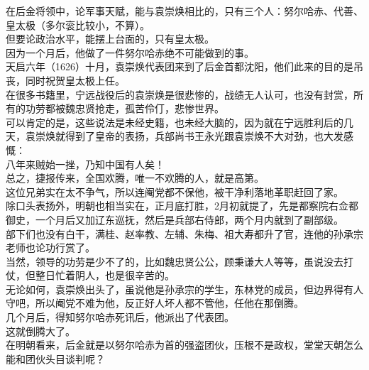 \begin{multicols}{\theparacolNo}
在后金将领中，论军事天赋，能与袁崇焕相比的，只有三个人：努尔哈赤、代善、皇太极（多尔衮比较小，不算）。\\

但要论政治水平，能摆上台面的，只有皇太极。\\

因为一个月后，他做了一件努尔哈赤绝不可能做到的事。\\

天启六年（1626）十月，袁崇焕代表团来到了后金首都沈阳，他们此来的目的是吊丧，同时祝贺皇太极上任。\\

在很多书籍里，宁远战役后的袁崇焕是很悲惨的，战绩无人认可，也没有封赏，所有的功劳都被魏忠贤抢走，孤苦伶仃，悲惨世界。\\

可以肯定的是，这些说法是未经史籍，也未经大脑的，因为就在宁远胜利后的几天，袁崇焕就得到了皇帝的表扬，兵部尚书王永光跟袁崇焕不大对劲，也大发感慨：\\

八年来贼始一挫，乃知中国有人矣！\\

总之，捷报传来，全国欢腾，唯一不欢腾的人，就是高第。\\

这位兄弟实在太不争气，所以连阉党都不保他，被干净利落地革职赶回了家。\\

除口头表扬外，明朝也相当实在，正月底打胜，2月初就提了，先是都察院右佥都御史，一个月后又加辽东巡抚，然后是兵部右侍郎，两个月内就到了副部级。\\

部下们也没有白干，满桂、赵率教、左辅、朱梅、祖大寿都升了官，连他的孙承宗老师也论功行赏了。\\

当然，领导的功劳是少不了的，比如魏忠贤公公，顾秉谦大人等等，虽说没去打仗，但整日忙着阴人，也是很辛苦的。\\

无论如何，袁崇焕出头了，虽说他是孙承宗的学生，东林党的成员，但边界得有人守吧，所以阉党不难为他，反正好人坏人都不管他，任他在那倒腾。\\

几个月后，得知努尔哈赤死讯后，他派出了代表团。\\

这就倒腾大了。\\

在明朝看来，后金就是以努尔哈赤为首的强盗团伙，压根不是政权，堂堂天朝怎么能和团伙头目谈判呢？\\


\end{multicols}
